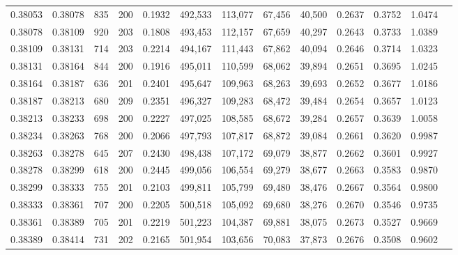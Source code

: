\begin{tabular}{rrrrrrrrrrrrr}
0.38053 & 0.38078 &   835 & 200 &                                     0.1932 & 492,533 & 113,077 &  67,456 &  40,500 & 0.2637 & 0.3752 & 1.0474 \\
0.38078 & 0.38109 &   920 & 203 &                                     0.1808 & 493,453 & 112,157 &  67,659 &  40,297 & 0.2643 & 0.3733 & 1.0389 \\
0.38109 & 0.38131 &   714 & 203 &                                     0.2214 & 494,167 & 111,443 &  67,862 &  40,094 & 0.2646 & 0.3714 & 1.0323 \\
0.38131 & 0.38164 &   844 & 200 &                                     0.1916 & 495,011 & 110,599 &  68,062 &  39,894 & 0.2651 & 0.3695 & 1.0245 \\
0.38164 & 0.38187 &   636 & 201 &                                     0.2401 & 495,647 & 109,963 &  68,263 &  39,693 & 0.2652 & 0.3677 & 1.0186 \\
0.38187 & 0.38213 &   680 & 209 &                                     0.2351 & 496,327 & 109,283 &  68,472 &  39,484 & 0.2654 & 0.3657 & 1.0123 \\
0.38213 & 0.38233 &   698 & 200 &                                     0.2227 & 497,025 & 108,585 &  68,672 &  39,284 & 0.2657 & 0.3639 & 1.0058 \\
0.38234 & 0.38263 &   768 & 200 &                                     0.2066 & 497,793 & 107,817 &  68,872 &  39,084 & 0.2661 & 0.3620 & 0.9987 \\
0.38263 & 0.38278 &   645 & 207 &                                     0.2430 & 498,438 & 107,172 &  69,079 &  38,877 & 0.2662 & 0.3601 & 0.9927 \\
0.38278 & 0.38299 &   618 & 200 &                                     0.2445 & 499,056 & 106,554 &  69,279 &  38,677 & 0.2663 & 0.3583 & 0.9870 \\
0.38299 & 0.38333 &   755 & 201 &                                     0.2103 & 499,811 & 105,799 &  69,480 &  38,476 & 0.2667 & 0.3564 & 0.9800 \\
0.38333 & 0.38361 &   707 & 200 &                                     0.2205 & 500,518 & 105,092 &  69,680 &  38,276 & 0.2670 & 0.3546 & 0.9735 \\
0.38361 & 0.38389 &   705 & 201 &                                     0.2219 & 501,223 & 104,387 &  69,881 &  38,075 & 0.2673 & 0.3527 & 0.9669 \\
0.38389 & 0.38414 &   731 & 202 &                                     0.2165 & 501,954 & 103,656 &  70,083 &  37,873 & 0.2676 & 0.3508 & 0.9602 \\

\end{tabular}

